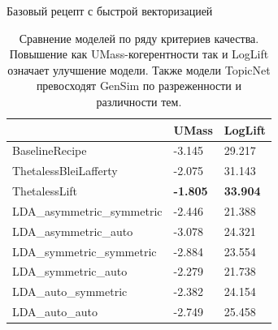 \begin{frame}{Базовый рецепт с быстрой векторизацией}

\begin{table}[h]
\begin{tabular}{|l|l|l|}
\hline
                         & UMass & LogLift             \\ \hline
BaselineRecipe           & -3.145         & 29.217         \\ \hline
ThetalessBleiLafferty   & -2.075         & 31.143           \\ \hline
ThetalessLift           & \textbf{-1.805}  & \textbf{33.904} \\ \hline
LDA\_asymmetric\_symmetric & -2.446          & 21.388           \\ \hline
LDA\_asymmetric\_auto      & -3.078          & 24.321          \\ \hline
LDA\_symmetric\_symmetric  & -2.884          & 23.554         \\ \hline
LDA\_symmetric\_auto       & -2.279         & 21.738          \\ \hline
LDA\_auto\_symmetric       & -2.382           & 24.154          \\ \hline
LDA\_auto\_auto            & -2.749          & 25.458 \\ \hline
\end{tabular}
\caption{Сравнение моделей по ряду критериев качества. Повышение как UMass-когерентности так и LogLift означает улучшение модели. Также модели TopicNet превосходят GenSim по разреженности и различности тем.}
\label{tbl:better_baseline}
\end{table} 

\end{frame}




